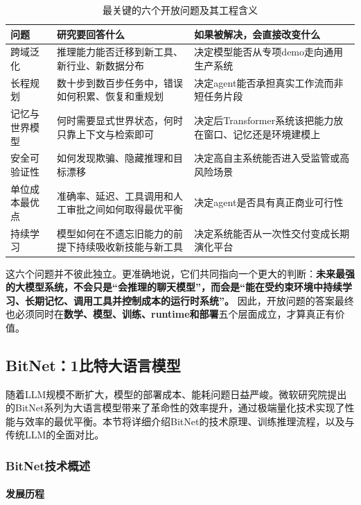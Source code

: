 \documentclass[12pt,a4paper]{article}
\begin{document}
\begin{table}[H]
\centering
\small
\caption{最关键的六个开放问题及其工程含义}
\begin{tabular}{p{2.8cm}p{4.6cm}p{5.3cm}}
\toprule
\textbf{问题} & \textbf{研究要回答什么} & \textbf{如果被解决，会直接改变什么} \\
\midrule
跨域泛化 & 推理能力能否迁移到新工具、新行业、新数据分布 & 决定模型能否从专项demo走向通用生产系统 \\
长程规划 & 数十步到数百步任务中，错误如何积累、恢复和重规划 & 决定agent能否承担真实工作流而非短任务片段 \\
记忆与世界模型 & 何时需要显式世界状态，何时只靠上下文与检索即可 & 决定后Transformer系统该把能力放在窗口、记忆还是环境建模上 \\
安全可验证性 & 如何发现欺骗、隐藏推理和目标漂移 & 决定高自主系统能否进入受监管或高风险场景 \\
单位成本最优点 & 准确率、延迟、工具调用和人工审批之间如何取得最优平衡 & 决定agent是否具有真正商业可行性 \\
持续学习 & 模型如何在不遗忘旧能力的前提下持续吸收新技能与新工具 & 决定系统能否从一次性交付变成长期演化平台 \\
\bottomrule
\end{tabular}
\end{table}

这六个问题并不彼此独立。更准确地说，它们共同指向一个更大的判断：\textbf{未来最强的大模型系统，不会只是“会推理的聊天模型”，而会是“能在受约束环境中持续学习、长期记忆、调用工具并控制成本的运行时系统”。} 因此，开放问题的答案最终也必须同时在\textbf{数学、模型、训练、runtime和部署}五个层面成立，才算真正有价值。

\subsection{BitNet：1比特大语言模型}

随着LLM规模不断扩大，模型的部署成本、能耗问题日益严峻。微软研究院提出的BitNet系列为大语言模型带来了革命性的效率提升，通过极端量化技术实现了性能与效率的最优平衡。本节将详细介绍BitNet的技术原理、训练推理流程，以及与传统LLM的全面对比。

\subsubsection{BitNet技术概述}

\paragraph{发展历程}
\end{document}
